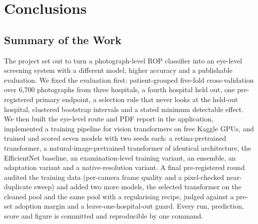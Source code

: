 \chapter{Conclusions}\label{ch:conclusions}
\section{Summary of the Work}
The project set out to turn a photograph-level ROP classifier into an eye-level screening system with a different model, higher accuracy and a publishable evaluation. We fixed the evaluation first: patient-grouped five-fold cross-validation over 6{,}700 photographs from three hospitals, a fourth hospital held out, one pre-registered primary endpoint, a selection rule that never looks at the held-out hospital, clustered bootstrap intervals and a stated minimum detectable effect. We then built the eye-level route and PDF report in the application, implemented a training pipeline for vision transformers on free Kaggle GPUs, and trained and scored seven models with two seeds each: a retina-pretrained transformer, a natural-image-pretrained transformer of identical architecture, the EfficientNet baseline, an examination-level training variant, an ensemble, an adaptation variant and a native-resolution variant. A final pre-registered round audited the training data (per-camera frame quality and a pixel-checked near-duplicate sweep) and added two more models, the selected transformer on the cleaned pool and the same pool with a regularising recipe, judged against a pre-set adoption margin and a leave-one-hospital-out guard. Every run, prediction, score and figure is committed and reproducible by one command.

